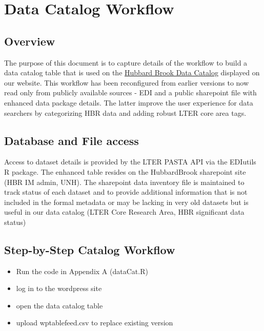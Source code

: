 \documentclass[
  letterpaper,
  DIV=11,
  numbers=noendperiod]{scrreprt}
\providecommand{\tightlist}{%
  \setlength{\itemsep}{0pt}\setlength{\parskip}{0pt}}\usepackage{longtable,booktabs,array}
\begin{document}

\chapter{Data Catalog Workflow}\label{data-catalog-workflow}

\section{Overview}\label{overview-2}

The purpose of this document is to capture details of the workflow to
build a data catalog table that is used on the
\href{https://hubbardbrook.org/data-catalog}{Hubbard Brook Data Catalog}
displayed on our website. This workflow has been reconfigured from
earlier versions to now read only from publicly available sources - EDI
and a public sharepoint file with enhanced data package details. The
latter improve the user experience for data searchers by categorizing
HBR data and adding robust LTER core area tags.

\section{Database and File access}\label{database-and-file-access}

Access to dataset details is provided by the LTER PASTA API via the
EDIutils R package. The enhanced table resides on the HubbardBrook
sharepoint site (HBR IM admin, UNH). The sharepoint data inventory file
is maintained to track status of each dataset and to provide additional
information that is not included in the formal metadata or may be
lacking in very old datasets but is useful in our data catalog (LTER
Core Research Area, HBR significant data status)

\section{Step-by-Step Catalog
Workflow}\label{step-by-step-catalog-workflow}

\begin{itemize}
\tightlist
\item
  Run the code in Appendix A (dataCat.R)
\item
  log in to the wordpress site
\item
  open the data catalog table
\item
  upload wptablefeed.csv to replace existing version
\end{itemize}
\end{document}
